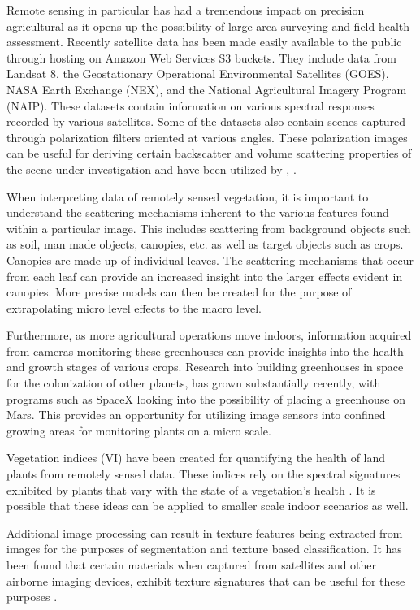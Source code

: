 Remote sensing in particular has had a tremendous impact on precision agricultural as it opens up the possibility of large area surveying and field health assessment.  Recently satellite data has been made easily available to the public through hosting on Amazon Web Services S3 buckets.  They include data from Landsat 8, the Geostationary Operational Environmental Satellites (GOES), NASA Earth Exchange (NEX), and the National Agricultural Imagery Program (NAIP).  These datasets contain information on various spectral responses recorded by various satellites.  Some of the datasets also contain scenes captured through polarization filters oriented at various angles. These polarization images can be useful for deriving certain backscatter and volume scattering properties of the scene under investigation and have been utilized by \cite{mississippi}, \cite{sarag}.

When interpreting data of remotely sensed vegetation, it is important to understand the scattering mechanisms inherent to the various features found within a particular image.  This includes scattering from background objects such as soil, man made objects, canopies, etc. as well as target objects such as crops. Canopies are made up of individual leaves.  The scattering mechanisms that occur from each leaf can provide an increased insight into the larger effects evident in canopies. More precise models can then be created for the purpose of extrapolating micro level effects to the macro level.

Furthermore, as more agricultural operations move indoors, information acquired from cameras monitoring these greenhouses can provide insights into the health and growth stages of various crops. Research into building greenhouses in space for the colonization of other planets, has grown substantially recently, with programs such as SpaceX looking into the possibility of placing a greenhouse on Mars.  This provides an opportunity for utilizing image sensors into confined growing areas for monitoring plants on a micro scale.

Vegetation indices (VI) have been created for quantifying the health of land plants from remotely sensed data.  These indices rely on the spectral signatures exhibited by plants that vary with the state of a vegetation’s health \cite{remotesensing}.  It is possible that these ideas can be applied to smaller scale indoor scenarios as well.

Additional image processing can result in texture features being extracted from images for the purposes of segmentation and texture based classification.  It has been found that certain materials when captured from satellites and other airborne imaging devices, exhibit texture signatures that can be useful for these purposes \cite{seaice}.

